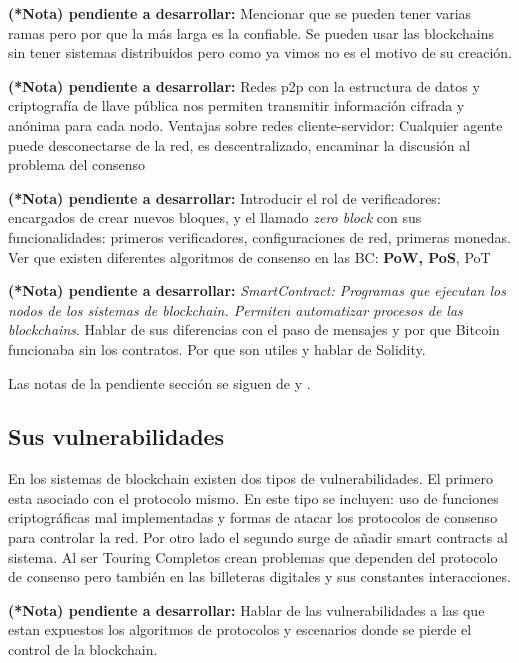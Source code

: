 \documentclass[14pt,letterpaper]{article}
\begin{document}
{\small {\bf (*Nota) pendiente a desarrollar:} Mencionar que se pueden
  tener varias ramas pero por que la más larga es la confiable.
  Se pueden usar las blockchains sin tener sistemas distribuidos pero
  como ya vimos no es el motivo de su creación. }

{\small {\bf (*Nota) pendiente a desarrollar:} Redes p2p con la
  estructura de datos y criptografía de llave pública nos permiten transmitir
  información cifrada y anónima para cada nodo. Ventajas sobre
  redes cliente-servidor: Cualquier agente puede desconectarse de
  la red, es descentralizado, encaminar la discusión al problema del consenso}

{\small {\bf (*Nota) pendiente a desarrollar:} Introducir el rol de verificadores:
  encargados de crear nuevos bloques, y
  el llamado {\it zero block} con sus funcionalidades: primeros verificadores,
  configuraciones de red, primeras monedas. Ver que existen diferentes
  algoritmos de consenso en las BC: {\bf PoW, PoS}, PoT}

{\small {\bf (*Nota) pendiente a desarrollar:} {\it SmartContract: Programas
    que ejecutan los nodos de los sistemas de blockchain. Permiten automatizar
    procesos de las blockchains}. Hablar de sus diferencias con el paso de mensajes y 
  por que Bitcoin funcionaba sin los contratos. Por que son utiles y hablar
  de Solidity. 
  }


Las notas de la pendiente sección se siguen de \cite{bitcoin} y \cite{ethereum}.

\subsection{Sus vulnerabilidades}

\noindent
En los sistemas de blockchain existen dos tipos de vulnerabilidades.
El primero esta asociado con el protocolo mismo. En este tipo
se incluyen: uso de funciones criptográficas mal implementadas y
formas de atacar los protocolos de consenso para controlar la red.
Por otro lado el segundo surge de añadir smart contracts al sistema. Al
ser Touring Completos crean problemas que dependen del
protocolo de consenso pero también en las billeteras digitales y sus constantes
interacciones. 

{\small {\bf (*Nota) pendiente a desarrollar:} Hablar de las vulnerabilidades
  a las que estan expuestos los algoritmos de protocolos y escenarios donde
  se pierde el control de la blockchain.}
\end{document}

